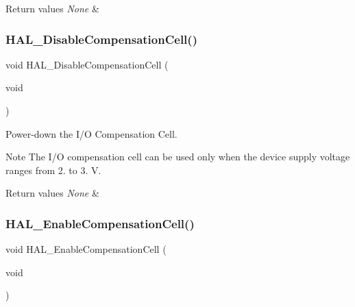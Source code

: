 \begin{DoxyRetVals}{Return values}
{\em None} & \\
\hline
\end{DoxyRetVals}
\mbox{\label{group___h_a_l___exported___functions___group2_ga653f1166b0e37afd40372550d806e667}} 
\subsubsection{\texorpdfstring{H\+A\+L\+\_\+\+Disable\+Compensation\+Cell()}{HAL\_DisableCompensationCell()}}
{\footnotesize\ttfamily void H\+A\+L\+\_\+\+Disable\+Compensation\+Cell (\begin{DoxyParamCaption}\item[{void}]{ }\end{DoxyParamCaption})}



Power-\/down the I/O Compensation Cell. 

\begin{DoxyNote}{Note}
The I/O compensation cell can be used only when the device supply voltage ranges from 2. to 3. V. 
\end{DoxyNote}

\begin{DoxyRetVals}{Return values}
{\em None} & \\
\hline
\end{DoxyRetVals}
\mbox{\label{group___h_a_l___exported___functions___group2_ga20b6ca07582e10aec5e15ad2fda7dfc1}} 
\subsubsection{\texorpdfstring{H\+A\+L\+\_\+\+Enable\+Compensation\+Cell()}{HAL\_EnableCompensationCell()}}
{\footnotesize\ttfamily void H\+A\+L\+\_\+\+Enable\+Compensation\+Cell (\begin{DoxyParamCaption}\item[{void}]{ }\end{DoxyParamCaption})}



